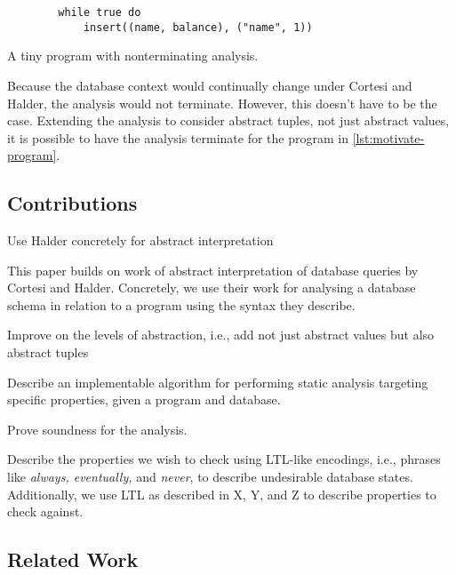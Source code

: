\begin{listing}
    \begin{verbatim}
        while true do
            insert((name, balance), ("name", 1))
    \end{verbatim}
    \caption{A tiny program with nonterminating analysis.}
    \label{lst:motivate-program}
\end{listing}


Because the database context would continually change under Cortesi and Halder, the analysis would not terminate.
However, this doesn't have to be the case.
Extending the analysis to consider abstract tuples, not just abstract values, it is possible to have the analysis terminate for the program in \autoref{lst:motivate-program}.


\subsection{Contributions}\label{subsec:contributions}

Use Halder concretely for abstract interpretation

This paper builds on work of abstract interpretation of database queries by Cortesi and Halder.
Concretely, we use their work for analysing a database schema in relation to a program using the syntax they describe.


Improve on the levels of abstraction, i.e., add not just abstract values but also abstract tuples

Describe an implementable algorithm for performing static analysis targeting specific properties, given a program and database.

Prove soundness for the analysis.


Describe the properties we wish to check using LTL-like encodings, i.e., phrases like \emph{always, eventually,} and \emph{never}, to describe undesirable database states.
Additionally, we use LTL as described in X, Y, and Z to describe properties to check against.


\subsection{Related Work}\label{subsec:related-work}

